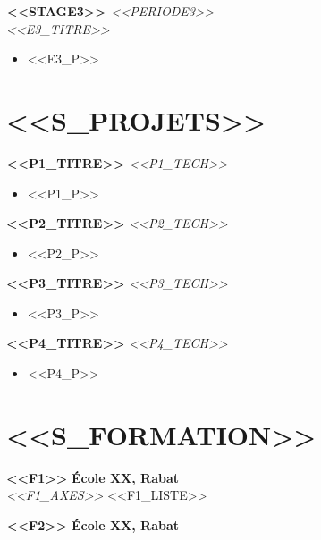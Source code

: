 \documentclass[11pt,a4paper]{extarticle}
\let\oldtextbf\textbf
\renewcommand{\textbf}[1]{\textcolor{primary}{\oldtextbf{#1}}}
\begin{document}
\textbf{<<STAGE3>>} \hfill \textit{<<PERIODE3>>} \\
\textit{<<E3_TITRE>>}
\begin{itemize}
\item <<E3_P>>
\end{itemize}

\section*{<<S_PROJETS>>}

\textbf{<<P1_TITRE>>} \hfill \textit{<<P1_TECH>>}
\begin{itemize}
\item <<P1_P>>
\end{itemize}

\vspace{1pt}

\textbf{<<P2_TITRE>>} \hfill \textit{<<P2_TECH>>}
\begin{itemize}
\item <<P2_P>>
\end{itemize}

\vspace{1pt}

\textbf{<<P3_TITRE>>} \hfill \textit{<<P3_TECH>>}
\begin{itemize}
\item <<P3_P>>
\end{itemize}

\vspace{1pt}

\textbf{<<P4_TITRE>>} \hfill \textit{<<P4_TECH>>}
\begin{itemize}
\item <<P4_P>>
\end{itemize}

\section*{<<S_FORMATION>>}

\textbf{<<F1>>} \hfill \textbf{École XX, Rabat} \\
\textit{<<F1_AXES>>} <<F1_LISTE>>

\vspace{1pt}

\textbf{<<F2>>} \hfill \textbf{École XX, Rabat}

\vspace{1pt}
\end{document}
